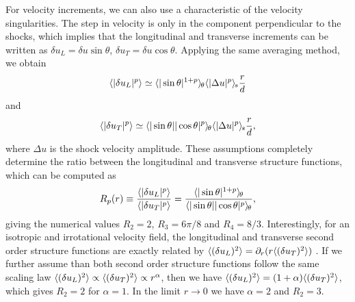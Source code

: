 For velocity increments, we can also use a characteristic of the
velocity singularities.  The step in velocity is only in the component
perpendicular to the shocks, which implies that the longitudinal and
transverse increments can be written as  $\delta u_L = \delta u
\sin\theta$, $\delta u_T = \delta u \cos\theta$.
%
Applying the same averaging method, we obtain
\begin{equation} \label{StepL}
\langle |\delta u_L|^p \rangle
\simeq
{\langle |\sin\theta|^{1+p} \rangle_{\hspace{-0.4mm}\theta}}
{\langle |\Delta u |^p \rangle_{\hspace{-0.4mm}s}} \frac{r}{d}
\end{equation}
and
\begin{equation} \label{StepT}
\langle |\delta u_T|^p \rangle
\simeq
{\langle |\sin\theta||\cos\theta|^{p} \rangle_{\hspace{-0.4mm}\theta}}
{\langle |\Delta u |^p \rangle_{\hspace{-0.4mm}s}} \frac{r}{d},
\end{equation}
where $\Delta u $ is the shock velocity amplitude.
%
These assumptions completely determine the ratio between the
longitudinal and transverse structure functions, which can be computed as
\begin{eqnarray} \label{Ratio}
R_p(r) \equiv \frac{\langle |\delta u_L|^p \rangle}{\langle |\delta u_T|^p \rangle} =
\frac{{\langle |\sin\theta|^{1+p} \rangle_{\hspace{-0.4mm}\theta}}}{{\langle |\sin\theta||\cos\theta|^p \rangle_{\hspace{-0.4mm}\theta}}},
\end{eqnarray}
giving the numerical values $R_2 = 2$, $R_3 = 6\pi/8$ and $R_4 = 8/3$.
Interestingly, for an isotropic and irrotational velocity field, the longitudinal and transverse second order structure functions
are exactly related by $\langle (\delta u_L)^2 \rangle = \partial_r( r\langle (\delta
u_T)^2 \rangle )$ \cite[]{Lindborg2007jas}. If we further assume than both second order structure functions follow
the same scaling law $\langle  (\delta u_L)^2 \rangle \propto \langle  (\delta
u_T)^2 \rangle \propto r^\alpha$, then we have $\langle  (\delta u_L)^2 \rangle =
(1+\alpha) \langle  (\delta u_T)^2 \rangle $, which gives $ R_2 = 2 $ for
$  \alpha = 1$.  In the limit $ r \rightarrow 0 $ we have $ \alpha = 2 $ and $ R_2 = 3 $.
%

